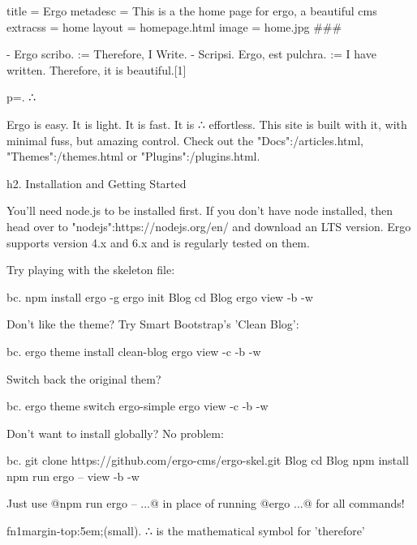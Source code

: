 title = Ergo
metadesc = This is a the home page for ergo, a beautiful cms
extracss = home
layout = homepage.html
image = home.jpg
###


- Ergo scribo. := Therefore, I Write.
- Scripsi. Ergo, est pulchra. :=  I have written. Therefore, it is beautiful.[1]


p=. ∴ 


Ergo is easy. It is light. It is fast. It is ∴ effortless. This site is built with it, with minimal fuss, but amazing control. Check out the "Docs":/articles.html, "Themes":/themes.html or "Plugins":/plugins.html.

h2. Installation and Getting Started

You'll need node.js to be installed first. If you don't have node installed, then head over to "nodejs":https://nodejs.org/en/ and download an LTS version. Ergo supports version 4.x and 6.x and is regularly tested on them.

Try playing with the skeleton file:

bc. npm install ergo -g
ergo init Blog
cd Blog
ergo view -b -w

Don't like the theme? Try Smart Bootstrap's 'Clean Blog':

bc. ergo theme install clean-blog
ergo view -c -b -w

Switch back the original them? 

bc. ergo theme switch ergo-simple
ergo view -c -b -w

Don't want to install globally? No problem:

bc. git clone https://github.com/ergo-cms/ergo-skel.git Blog
cd Blog
npm install
npm run ergo -- view -b -w

Just use @npm run ergo --  ...@ in place of running @ergo ...@ for all commands!

fn1{margin-top:5em;}(small). ∴ is the mathematical symbol for 'therefore'
